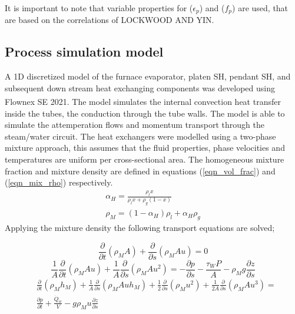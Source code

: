 \documentclass[review]{elsarticle}
\begin{document}
It is important to note that variable properties for ($\epsilon_p$) and ($f_p$) are used, that are based on the correlations of LOCKWOOD AND YIN.

\subsection{Process simulation model}
A 1D discretized model of the furnace evaporator, platen SH, pendant SH, and subsequent down stream heat exchanging components was developed using Flownex SE\textsuperscript{\textregistered} 2021. The model simulates the internal convection heat transfer inside the tubes, the conduction through the tube walls. The model is able to simulate the attemperation flows and momentum transport through the steam/water circuit. The heat exchangers were modelled using a two-phase mixture approach, this assumes that the fluid properties, phase velocities and temperatures are uniform per cross-sectional area. The homogeneous mixture fraction and mixture density are defined in equations (\ref{eqn_vol_frac}) and (\ref{eqn_mix_rho}) respectively.
\begin{gather}
\alpha_H = \frac{\rho_l x}{\rho_lx + \rho_g(1-x)} \label{eqn_vol_frac}\\  
\rho_M = (1-\alpha_H)\rho_l + \alpha_H\rho_g \label{eqn_mix_rho}
\end{gather}
Applying the mixture density the following transport equations are solved;

\begin{equation}\label{eqn_mix_conti}
\frac{\partial}{\partial t}(\rho_M A)+\frac{\partial}{\partial s}(\rho_MAu) = 0
\end{equation}
\begin{equation}\label{eqn_mix_mom}
\frac{1}{A} \frac{\partial}{\partial t}(\rho_M A u)+\frac{1}{A} \frac{\partial}{\partial s}(\rho_M A u^2) = -\frac{\partial p}{\partial s}-\frac{\tau_W P}{A}- \rho_M g \frac{\partial z}{\partial s}
\end{equation}
\begin{equation}\label{eqn_mix_energy}
\begin{split}
&\frac{\partial}{\partial t}(\rho_Mh_M)+\frac{1}{A}\frac{\partial}{\partial s}(\rho_MAuh_M)+\frac{1}{2}\frac{\partial}{\partial s}(\rho_Mu^2)+\frac{1}{2A}\frac{\partial}{\partial s}(\rho_MAu^3)=\\&\frac{\partial p}{\partial t} + \frac{\dot{Q}_w}{V}-g\rho_Mu\frac{\partial z}{\partial s}
\end{split}
\end{equation}
\end{document}
